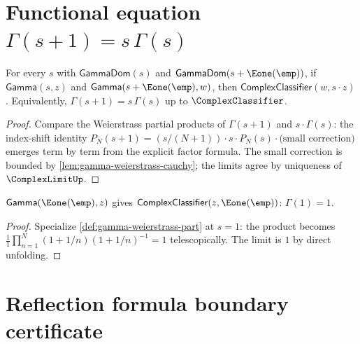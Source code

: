 \section{Functional equation \(\Gamma(s+1) = s\,\Gamma(s)\)}
\label{sec:gamma-recurrence}

\begin{theorem}
\label{thm:gamma-recurrence}
For every \(s\) with \(\mathsf{GammaDom}(s)\) and \(\mathsf{GammaDom}(s + \Eone(\emp))\), if \(\mathsf{Gamma}(s, z)\) and \(\mathsf{Gamma}(s + \Eone(\emp), w)\), then \(\mathsf{ComplexClassifier}(w, s \cdot z)\). Equivalently, \(\Gamma(s+1) = s\,\Gamma(s)\) up to \(\ComplexClassifier\).
\end{theorem}
\begin{proof}
Compare the Weierstrass partial products of \(\Gamma(s+1)\) and \(s \cdot \Gamma(s)\): the index-shift identity \(P_N(s+1) = (s/(N+1)) \cdot s \cdot P_N(s) \cdot \text{(small correction)}\) emerges term by term from the explicit factor formula. The small correction is bounded by \autoref{lem:gamma-weierstrass-cauchy}; the limits agree by uniqueness of \(\ComplexLimitUp\).
\end{proof}

\begin{theorem}[Gamma at \(1\)]
\label{thm:gamma-at-one}
\(\mathsf{Gamma}(\Eone(\emp), z)\) gives \(\mathsf{ComplexClassifier}(z, \Eone(\emp))\): \(\Gamma(1) = 1\).
\end{theorem}
\begin{proof}
Specialize \autoref{def:gamma-weierstrass-part} at \(s = 1\): the product becomes \(\frac{1}{1} \prod_{n=1}^{N} (1 + 1/n) (1 + 1/n)^{-1} = 1\) telescopically. The limit is \(1\) by direct unfolding.
\end{proof}

\section{Reflection formula boundary certificate}
\label{sec:gamma-reflection}

